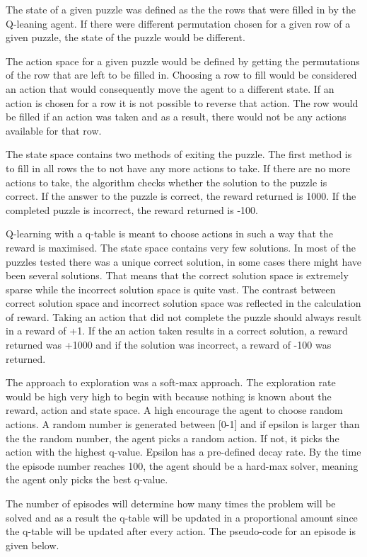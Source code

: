 \documentclass{svproc}
\begin{document}
The state of a given puzzle was defined as the the rows that were filled in by the Q-leaning agent. If there were different permutation chosen for a given row of a given puzzle, the state of the puzzle would be different.

The action space for a given puzzle would be defined by getting the permutations of the row that are left to be filled in. Choosing a row to fill would be considered an action that would consequently move the agent to a different state. If an action is chosen for a row it is not possible to reverse that action. The row would be filled if an action was taken and as a result, there would not be any actions available for that row.

The state space contains two methods of exiting the puzzle. The first method is to fill in all rows the to not have any more actions to take. If there are no more actions to take, the algorithm checks whether the solution to the puzzle is correct. If the answer to the puzzle is correct, the reward returned is 1000. If the completed puzzle is incorrect, the reward returned is -100.

Q-learning with a q-table is meant to choose actions in such a way that the reward is maximised. The state space contains very few solutions. In most of the puzzles tested there was a unique correct solution, in some cases there might have been several solutions. That means that the correct solution space is extremely sparse while the incorrect solution space is quite vast. The contrast between correct solution space and incorrect solution space was reflected in the calculation of reward. Taking an action that did not complete the puzzle should always result in a reward of +1. If the an action taken results in a correct solution, a reward returned was +1000 and if the solution was incorrect, a reward of -100 was returned.

The approach to exploration was a soft-max approach. The exploration rate would be high very high to begin with because nothing is known about the reward, action and state space. A high encourage the agent to choose random actions. A random number is generated between [0-1] and if epsilon is larger than the the random number, the agent picks a random action. If not, it picks the action with the highest q-value. Epsilon has a pre-defined decay rate. By the time the episode number reaches 100, the agent should be a hard-max solver, meaning the agent only picks the best q-value.

The number of episodes will determine how many times the problem will be solved and as a result the q-table will be updated in a proportional amount since the q-table will be updated after every action. The pseudo-code for an episode is given below.
\end{document}

